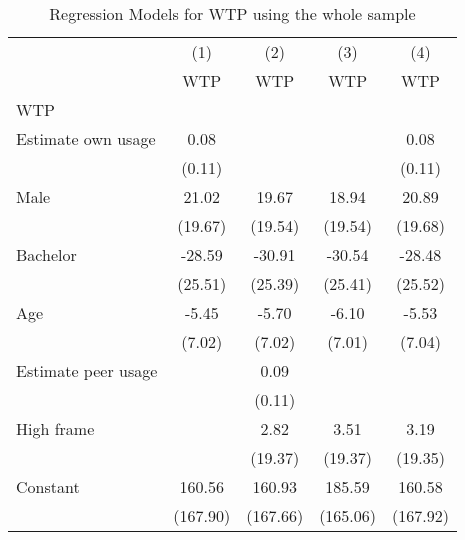 \begin{table}[htbp]\centering
\def\sym#1{\ifmmode^{#1}\else\(^{#1}\)\fi}
\caption{Regression Models for WTP using the whole sample}
\begin{tabular}{l*{4}{c}}
\hline\hline
                &\multicolumn{1}{c}{(1)}&\multicolumn{1}{c}{(2)}&\multicolumn{1}{c}{(3)}&\multicolumn{1}{c}{(4)}\\
                &\multicolumn{1}{c}{WTP}&\multicolumn{1}{c}{WTP}&\multicolumn{1}{c}{WTP}&\multicolumn{1}{c}{WTP}\\
\hline
WTP             &                  &                  &                  &                  \\
Estimate own usage&     0.08         &                  &                  &     0.08         \\
                &   (0.11)         &                  &                  &   (0.11)         \\
[1em]
Male            &    21.02         &    19.67         &    18.94         &    20.89         \\
                &  (19.67)         &  (19.54)         &  (19.54)         &  (19.68)         \\
[1em]
Bachelor        &   -28.59         &   -30.91         &   -30.54         &   -28.48         \\
                &  (25.51)         &  (25.39)         &  (25.41)         &  (25.52)         \\
[1em]
Age             &    -5.45         &    -5.70         &    -6.10         &    -5.53         \\
                &   (7.02)         &   (7.02)         &   (7.01)         &   (7.04)         \\
[1em]
Estimate peer usage&                  &     0.09         &                  &                  \\
                &                  &   (0.11)         &                  &                  \\
[1em]
High frame      &                  &     2.82         &     3.51         &     3.19         \\
                &                  &  (19.37)         &  (19.37)         &  (19.35)         \\
[1em]
Constant        &   160.56         &   160.93         &   185.59         &   160.58         \\
                & (167.90)         & (167.66)         & (165.06)         & (167.92)         \\

\end{tabular}
\end{table}

